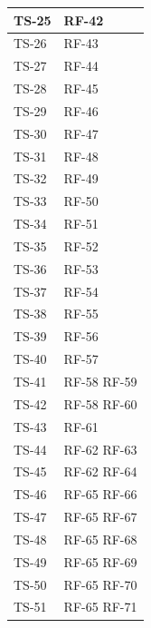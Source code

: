 \documentclass[8pt]{article}
\begin{document}
\begin{longtable}{|>{\centering}p{4cm}|>{\centering\arraybackslash}p{4cm}|}
    \hline
    TS-25 & RF-42 \\
    \hline
    TS-26 & RF-43 \\
    \hline
    TS-27 & RF-44 \\
    \hline
    TS-28 & RF-45 \\
    \hline
    TS-29 & RF-46 \\
    \hline
    TS-30 & RF-47 \\
    \hline
    TS-31 & RF-48 \\
    \hline
    TS-32 & RF-49 \\
    \hline
    TS-33 & RF-50 \\
    \hline 
    TS-34 & RF-51 \\
    \hline
    TS-35 & RF-52 \\
    \hline
    TS-36 & RF-53 \\
    \hline
    TS-37 & RF-54 \\
    \hline
    TS-38 & RF-55 \\
    \hline
    TS-39 & RF-56 \\
    \hline
    TS-40 & RF-57 \\
    \hline
    TS-41 & RF-58 \newline
            RF-59 \\
    \hline
    TS-42 & RF-58 \newline
            RF-60 \\
    \hline
    TS-43 & RF-61 \\
    \hline
    TS-44 & RF-62 \newline
            RF-63 \\
    \hline
    TS-45 & RF-62 \newline
            RF-64 \\
    \hline
    TS-46 & RF-65 \newline 
            RF-66 \\
    \hline
    TS-47 & RF-65 \newline
            RF-67 \\
    \hline
    TS-48 & RF-65 \newline
            RF-68 \\
    \hline
    TS-49 & RF-65 \newline
            RF-69 \\
    \hline
    TS-50 & RF-65 \newline
            RF-70 \\
    \hline
    TS-51 & RF-65 \newline
            RF-71 \\

\end{longtable}
\end{document}
